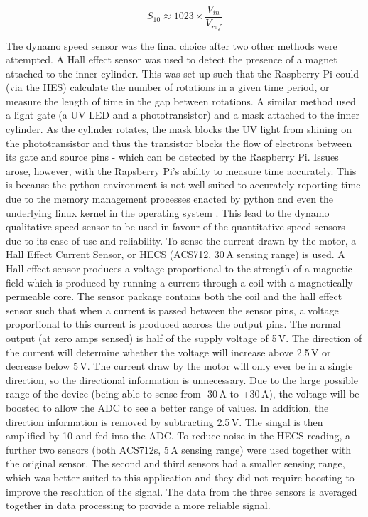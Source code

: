 \documentclass[twoside,a4]{report}
\def\br{\newline \newline \noindent}
\begin{document}
	\begin{equation}
	S_{10} \approx 1023 \times \frac{V_{in}}{V_{ref}}
	\label{eqnadc}
	\end{equation}
	
	
	\noindent
	The dynamo speed sensor was the final choice after two other methods were attempted. A Hall effect sensor was used to detect the presence of a magnet attached to the inner cylinder. This was set up such that the Raspberry Pi could (via the HES) calculate the number of rotations in a given time period, or measure the length of time in the gap between rotations. A similar method used a light gate (a UV LED and a phototransistor) and a mask attached to the inner cylinder. As the cylinder rotates, the mask blocks the UV light from shining on the phototransistor and thus the transistor blocks the flow of electrons between its gate and source pins - which can be detected by the Raspberry Pi. Issues arose, however, with the Rapsberry Pi's ability to measure time accurately. This is because the python environment is not well suited to accurately reporting time due to the memory management processes enacted by python and even the underlying linux kernel in the operating system \cite{backrpibadrealtime}. This lead to the dynamo qualitative speed sensor to be used in favour of the quantitative speed sensors due to its ease of use and reliability.
	\br
	To sense the current drawn by the motor, a Hall Effect Current Sensor, or HECS (ACS712, 30\,A sensing range) is used. A Hall effect sensor produces a voltage proportional to the strength of a magnetic field which is produced by running a current through a coil with a magnetically permeable core. The sensor package contains both the coil and the hall effect sensor such that when a current is passed between the sensor pins, a voltage proportional to this current is produced accross the output pins. The normal output (at zero amps sensed) is half of the supply voltage of 5\,V. The direction of the current will determine whether the voltage will increase above 2.5\,V or decrease below 5\,V. The current draw by the motor will only ever be in a single direction, so the directional information is unnecessary. Due to the large possible range of the device (being able to sense from -30\,A to +30\,A), the voltage will be boosted to allow the ADC to see a better range of values. In addition, the direction information is removed by subtracting 2.5\,V. The singal is then amplified by 10 and fed into the ADC. 
	\br
	To reduce noise in the HECS reading, a further two sensors (both ACS712s, 5\,A sensing range) were used together with the original sensor. The second and third sensors had a smaller sensing range, which was better suited to this application and they did not require boosting to improve the resolution of the signal. The data from the three sensors is averaged together in data processing to provide a more reliable signal.
	
\end{document}
